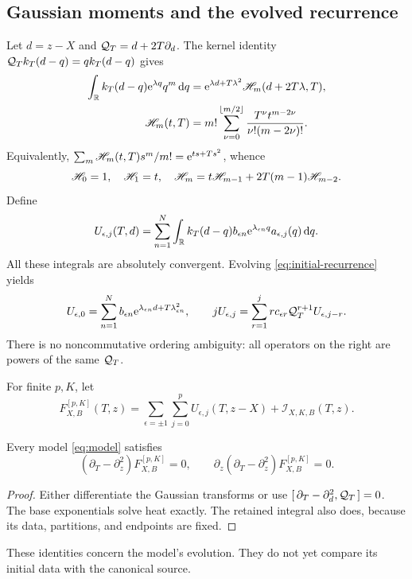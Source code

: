 \subsection{Gaussian moments and the evolved recurrence}
Let \(d=z-X\) and \(\mathcal Q_T=d+2T\partial_d\).
The kernel identity \(\mathcal Q_Tk_T(d-q)=qk_T(d-q)\) gives
\begin{subequations}\label{eq:moment}
\begin{align}
 \int_\mathbb R k_T(d-q)\mathrm e^{\lambda q}q^m\,\mathrm d q
 &=\mathrm e^{\lambda d+T\lambda^2}\mathscr H_m(d+2T\lambda,T),\\
 \mathscr H_m(t,T)&=m!\sum_{\nu=0}^{\lfloor m/2\rfloor}
            \frac{T^\nu t^{m-2\nu}}{\nu!(m-2\nu)!}.
\end{align}
\end{subequations}
Equivalently,
\(\sum_m\mathscr H_m(t,T)s^m/m!=\mathrm e^{ts+Ts^2}\), whence
\begin{equation}
 \mathscr H_0=1,\quad\mathscr H_1=t,\quad
 \mathscr H_m=t\mathscr H_{m-1}+2T(m-1)\mathscr H_{m-2}.
 \label{eq:moment-recurrence}
\end{equation}
Define
\[
 U_{\epsilon,j}(T,d)
  =\sum_{n=1}^N\int_\mathbb R k_T(d-q)b_{\epsilon n}
                         \mathrm e^{\lambda_{\epsilon n}q}a_{\epsilon,j}(q)\,\mathrm d q.
\]
All these integrals are absolutely convergent. Evolving
\eqref{eq:initial-recurrence} yields
\begin{equation}
 U_{\epsilon,0}=\sum_{n=1}^Nb_{\epsilon n}
                      \mathrm e^{\lambda_{\epsilon n}d+T\lambda_{\epsilon n}^2},
 \qquad
 jU_{\epsilon,j}=\sum_{r=1}^j
                  r c_{\epsilon r}\mathcal Q_T^{r+1}U_{\epsilon,j-r}.
 \label{eq:evolved-recurrence}
\end{equation}
There is no noncommutative ordering ambiguity: all operators on the
right are powers of the same \(\mathcal Q_T\).

\begin{definition}\label{def:model}
For finite \(p,K\), let
\begin{equation}
 F_{X,B}^{[p,K]}(T,z)=
       \sum_{\epsilon=\pm1}\sum_{j=0}^p U_{\epsilon,j}(T,z-X)
                    +\mathcal I_{X,K,B}(T,z).
 \label{eq:model}
\end{equation}
\end{definition}
\begin{proposition}\label{prop:residual}
Every model \eqref{eq:model} satisfies
\[
 (\partial_T-\partial_z^2)F_{X,B}^{[p,K]}=0,\qquad
 \partial_z(\partial_T-\partial_z^2)F_{X,B}^{[p,K]}=0.
\]
\end{proposition}
\begin{proof}
Either differentiate the Gaussian transforms or use
\([\,\partial_T-\partial_d^2,\mathcal Q_T\,]=0\).
The base exponentials solve heat exactly. The retained integral
also does, because its data, partitions, and endpoints are fixed.
\end{proof}
These identities concern the model's evolution. They do not yet
compare its initial data with the canonical source.

